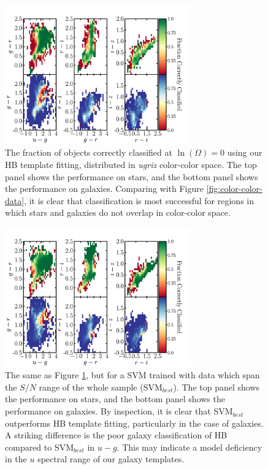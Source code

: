 \documentclass[12pt,preprint]{aastex}
\begin{document}
\begin{figure}
\centering
 \includegraphics[clip=true, trim=0cm 0cm 0.0cm 0.cm,width=8cm]{fig5.pdf}
\caption{The fraction of objects correctly classified at
  $\ln(\Omega)=0$ using our HB template fitting, distributed in {\it
    ugriz} color-color space.  The top panel shows the performance on stars, and the bottom panel shows the performance on galaxies.  Comparing with Figure
  \ref{fig:color-color-data}, it is clear that classification is most
  successful for regions in which stars and galaxies do not overlap in
  color-color space.}
\label{fig:color-color-hb-fraction}
\end{figure}

\begin{figure}
\centering
 \includegraphics[clip=true, trim=0cm 0cm 0.0cm 0.cm,width=8cm]{fig6.pdf}
\caption{The same as Figure \ref{fig:color-color-hb-fraction}, but for
  a SVM trained with data which span the $S/N$ range of the whole sample
  (SVM$_{best}$).  The top panel shows the performance on stars, and
  the bottom panel shows the performance on galaxies.  By inspection,
  it is clear that SVM$_{best}$ outperforms HB template fitting,
  particularly in the case of galaxies.  A striking difference is the
  poor galaxy classification of HB compared to SVM$_{best}$ in $u-g$.
  This may indicate a model deficiency in the $u$ spectral range of
  our galaxy templates.}
\label{fig:color-color-svm-fraction}
\end{figure}
\end{document}
